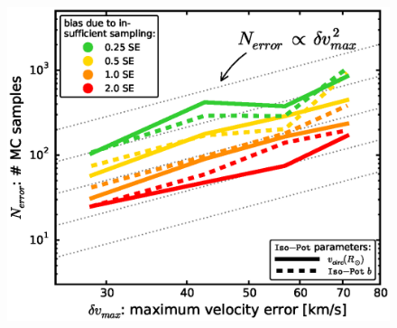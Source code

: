 \begin{figure}[!htbp]
\centering
\includegraphics[width=\columnwidth]{figs/isoSphFlexErrConv_MC_vs_error_2.eps}

\end{figure}
